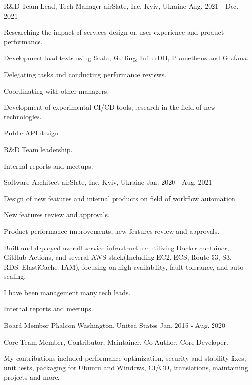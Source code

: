 
\begin{cventries}

  \cventry
    {R\&D Team Lead, Tech Manager}
    {airSlate, Inc.}
    {Kyiv, Ukraine}
    {Aug. 2021 - Dec. 2021}
    {
      \begin{cvitems}
        \item {Researching the impact of services design on user experience and product performance.}
        \item {Development load tests using Scala, Gatling, InfluxDB, Prometheus and Grafana.}
        \item {Delegating tasks and conducting performance reviews.}
        \item {Coordinating with other managers.}
        \item {Development of experimental CI/CD tools, research in the field of new technologies.}
        \item {Public API design.}
        \item {R\&D Team leadership.}
        \item {Internal reports and meetups.}
      \end{cvitems}
    }

  \cventry
    {Software Architect}
    {airSlate, Inc.}
    {Kyiv, Ukraine}
    {Jan. 2020 - Aug. 2021}
    {
      \begin{cvitems}
        \item {Design of new features and internal products on field of workflow automation.}
        \item {New features review and approvals.}
        \item {Product performance improvements, new features review and approvals.}
        \item {Built and deployed overall service infrastructure utilizing Docker container, GitHub Actions, and several AWS stack(Including EC2, ECS, Route 53, S3, RDS, ElastiCache, IAM), focusing on high-availability, fault tolerance, and auto-scaling.}
        \item {I have been management many tech leads.}
        \item {Internal reports and meetups.}
      \end{cvitems}
    }

  \cventry
    {Board Member}
    {Phalcon}
    {Washington, United States}
    {Jan. 2015 - Aug. 2020}
    {
      \begin{cvitems}
        \item {Core Team Member, Contributor, Maintainer, Co-Author, Core Developer.}
        \item {My contributions included performance optimization, security and stability fixes, unit tests, packaging for Ubuntu and Windows, CI/CD, translations, maintaining projects and more.}
      \end{cvitems}
    }


\end{cventries}

